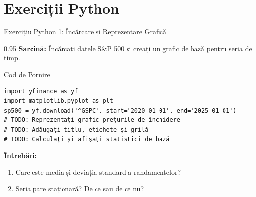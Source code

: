 \documentclass[9pt, aspectratio=169, t]{beamer}
\begin{document}
\section{Exerciții Python}

\begin{frame}[fragile]{Exercițiu Python 1: Încărcare și Reprezentare Grafică}
    \begin{cminipage}{0.95\textwidth}
    \textbf{Sarcină:} Încărcați datele S\&P 500 și creați un grafic de bază pentru seria de timp.

    \vspace{0.1cm}

    \begin{block}{Cod de Pornire}
    \footnotesize
    \begin{verbatim}
import yfinance as yf
import matplotlib.pyplot as plt
sp500 = yf.download('^GSPC', start='2020-01-01', end='2025-01-01')
# TODO: Reprezentați grafic prețurile de închidere
# TODO: Adăugați titlu, etichete și grilă
# TODO: Calculați și afișați statistici de bază
    \end{verbatim}
    \end{block}

    \textbf{Întrebări:}
    \begin{enumerate}\setlength{\itemsep}{0pt}
        \item Care este media și deviația standard a randamentelor?
        \item Seria pare staționară? De ce sau de ce nu?
    \end{enumerate}
    \end{cminipage}
\end{frame}
\end{document}
